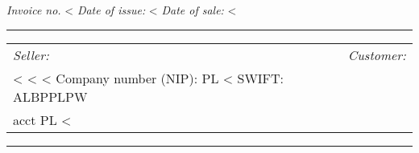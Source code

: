 \documentclass[polish]{dinbrief}
\newcommand{\lyxline}[1][1pt]{%
  \par\noindent%
  \rule[.5ex]{\linewidth}{#1}\par}
\providecommand{\tabularnewline}{\\}
\begin{document}
\begin{flushleft}
\textbf{\Large <%
\par\end{flushleft}{\Large \par}

\begin{flushleft}
\emph{Invoice no.} <%
\emph{Date of issue:} <%
\emph{Date of sale:} <%
\par\end{flushleft}

\begin{flushleft}
\medskip{}

\par\end{flushleft}

\lyxline{\normalsize}


\begin{flushleft}
\begin{tabular}{|l|l|l|}
\cline{1-1} \cline{3-3}
\emph{Seller:} &  & \emph{Customer:}\tabularnewline
\cline{1-1} \cline{3-3}
<%
<%
<%
Company number (NIP): PL <%
SWIFT: ALBPPLPW\\
acct PL <%
\cline{1-1} \cline{3-3}
\end{tabular}
\par\end{flushleft}

\medskip{}

\lyxline{\normalsize}

\end{document}
